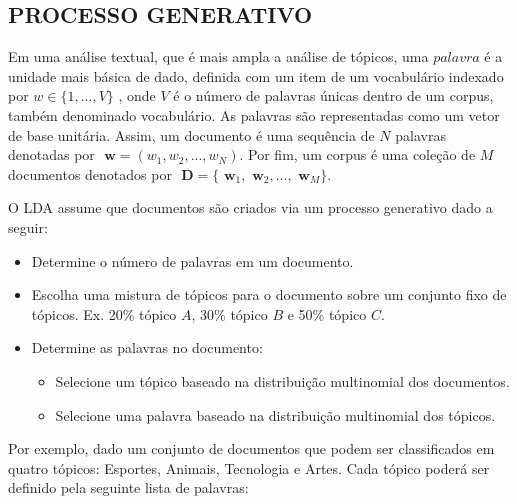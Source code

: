 \documentclass[12pt,a4paper]{article}
\begin{document}
  
  
  \subsection{PROCESSO GENERATIVO}
  
  Em uma análise textual, que é mais ampla a análise de  tópicos, uma $palavra$ é a unidade mais básica de dado, definida com um item de um vocabulário indexado por \(w \in \{1,. . . , V\}\)  , onde $V$ é o número de palavras únicas dentro de um corpus, também denominado vocabulário. As palavras são representadas como um vetor de base unitária. Assim, um documento é uma sequência de $N$ palavras denotadas por \(\textbf{ w} = (w_1, w_2,. . . ,  w_N)\). Por fim, um corpus é uma coleção de $M$ documentos denotados por \(\textbf{ D} = \{\textbf{ w}_1, \textbf{ w}_2, . . ., \textbf{ w}_M\}\).
  
   O LDA assume que documentos são criados via um processo generativo dado a seguir:

   \begin{itemize}
     \item Determine o número de palavras em um documento.
     \item Escolha uma mistura de tópicos para o documento sobre um conjunto fixo de tópicos. Ex. 20\% tópico $A$, 30\% tópico $B$ e 50\% tópico $C$.
     \item Determine as palavras no documento:
     \begin{itemize}
       \item Selecione um tópico baseado na distribuição multinomial dos documentos.
       \item Selecione uma palavra baseado na distribuição multinomial dos tópicos.
     \end{itemize}
   \end{itemize}

   Por exemplo, dado um conjunto de documentos que podem ser classificados em quatro tópicos: Esportes, Animais, Tecnologia e Artes. 
   Cada tópico poderá ser definido pela seguinte lista de palavras:
  
\end{document}
